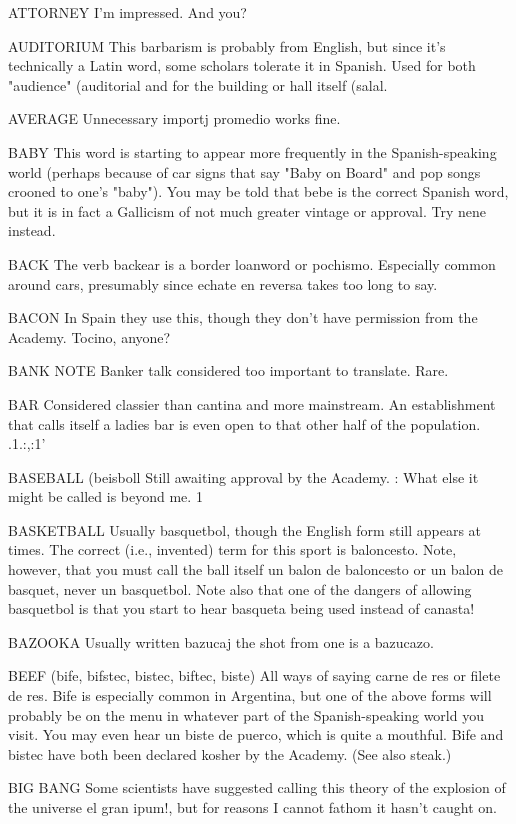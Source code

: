 ATTORNEY I'm impressed. And you?

AUDITORIUM This barbarism is probably from English, but
since it's technically a Latin word, some scholars tolerate it in Spanish. Used for both "audience" (auditorial and for the building or hall
itself (salal.

AVERAGE Unnecessary importj promedio works fine.

BABY This word is starting to appear more frequently in the
Spanish-speaking world (perhaps because of car signs that say "Baby on
Board" and pop songs crooned to one's "baby"). You may be told that
bebe is the correct Spanish word, but it is in fact a Gallicism of not
much greater vintage or approval. Try nene instead.

BACK The verb backear is a border loanword or pochismo.
Especially common around cars, presumably since echate en reversa
takes too long to say.

BACON In Spain they use this, though they don't have permission from the Academy. Tocino, anyone?

BANK NOTE Banker talk considered too important to translate. Rare.

BAR Considered classier than cantina and more mainstream.
An establishment that calls itself a ladies bar is even open to that
other half of the population. .1.:,:1'

BASEBALL (beisboll Still awaiting approval by the Academy. :
What else it might be called is beyond me. 1

BASKETBALL Usually basquetbol, though the English form
still appears at times. The correct (i.e., invented) term for this sport is
baloncesto. Note, however, that you must call the ball itself un balon
de baloncesto or un balon de basquet, never un basquetbol. Note also
that one of the dangers of allowing basquetbol is that you start to hear
basqueta being used instead of canasta!

BAZOOKA Usually written bazucaj the shot from one is a
bazucazo.

BEEF (bife, bifstec, bistec, biftec, biste) All ways of saying
carne de res or filete de res. Bife is especially common in Argentina,
but one of the above forms will probably be on the menu in whatever
part of the Spanish-speaking world you visit. You may even hear un
biste de puerco, which is quite a mouthful. Bife and bistec have both
been declared kosher by the Academy. (See also steak.)

BIG BANG Some scientists have suggested calling this theory
of the explosion of the universe el gran ipum!, but for reasons I cannot
fathom it hasn't caught on.

